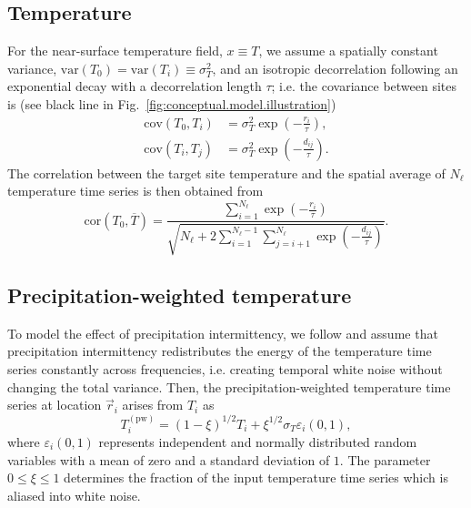 \documentclass[cp]{copernicus}
\begin{document}
\subsection{Temperature}
\label{app:concept.model.t2m}

For the near-surface temperature field, $x \equiv T$, we assume a spatially
constant variance, $\mathrm{var}(T_0)=\mathrm{var}(T_i)\equiv\sigma_T^2$, and an
isotropic decorrelation following an exponential decay with a decorrelation
length $\tau$; i.e. the covariance between sites is (see black line in
Fig.~\ref{fig:conceptual.model.illustration})
%
\begin{align}
\label{eq:t2m.decorr}
\mathrm{cov}\left(T_0,T_i\right)&=\sigma_T^2\exp{\left(-\frac{r_i}{\tau}\right)},\\
\mathrm{cov}\left(T_i,T_j\right)&=\sigma_T^2\exp{\left(-\frac{d_{ij}}{\tau}\right)}.
\end{align}
%
The correlation between the target site temperature and the spatial average of
$N_{\ell}$ temperature time series is then obtained from
%
\begin{equation}
\label{eq:t2m.corr}
\mathrm{cor}\left(T_0,\overline{T}\right)=
\frac{\sum_{i=1}^{N_{\ell}}\exp{\left(-\frac{r_i}{\tau}\right)}}
{\sqrt{N_{\ell}+2\sum_{i=1}^{N_{\ell}-1}
\sum_{j=i+1}^{N_{\ell}}{\exp{\left(-\frac{d_{ij}}{\tau}\right)}}}}.
\end{equation}

\subsection{Precipitation-weighted temperature}
\label{app:concept.model.t2m.pw}

To model the effect of precipitation intermittency, we follow
\citet{Laepple2018} and assume that precipitation intermittency redistributes
the energy of the temperature time series constantly across frequencies,
i.e. creating temporal white noise without changing the total variance. Then,
the precipitation-weighted temperature time series at location $\vec{r}_i$
arises from $T_i$ as
%
\begin{equation}
\label{eq:precip.weighting}
T_i^{\mathrm{(pw)}}=
\left(1-\xi\right)^{1/2}T_i + \xi^{1/2} \sigma_T \varepsilon_i(0,1),
\end{equation}
%
where $\varepsilon_i(0,1)$ represents independent and normally distributed
random variables with a mean of zero and a standard deviation of $1$. The
parameter $0\leq\xi\leq1$ determines the fraction of the input temperature time
series which is aliased into white noise.
\end{document}
